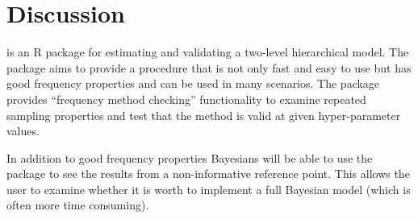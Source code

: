 \documentclass[article]{jss}
\begin{document}



\section[Discussion]{Discussion}
 is an R package for estimating and validating a two-level hierarchical model. The package aims to provide a procedure that is not only fast and easy to use but has good frequency properties and can be used in many scenarios. The package provides ``frequency method checking'' functionality to examine repeated sampling properties and test that the method is valid at given hyper-parameter values.

In addition to good frequency properties Bayesians will be able to use the package to see the results from a non-informative reference point. This allows the user to examine whether it is worth to implement a full Bayesian model (which is often more time consuming). 
\end{document}
